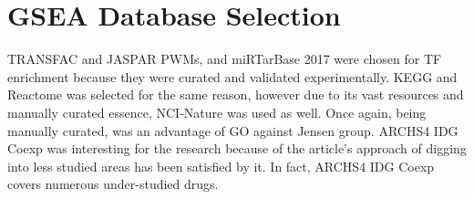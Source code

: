 \documentclass[3p,authoryear,preprint,12pt]{elsarticle}
\begin{document}
\appendix

\section{GSEA Database Selection}\label{appendix-title-1f696b9ef905}
TRANSFAC and JASPAR PWMs, and miRTarBase 2017 were chosen for TF enrichment because they were curated and validated experimentally. KEGG and Reactome was selected for the same reason, however due to its vast resources and manually curated essence, NCI-Nature was used as well.
Once again, being manually curated, was an advantage of GO against Jensen group. ARCHS4 IDG Coexp was interesting for the research because of the article's approach of digging into less studied areas has been satisfied by it. In fact, ARCHS4 IDG Coexp covers numerous under-studied drugs.
\end{document}
